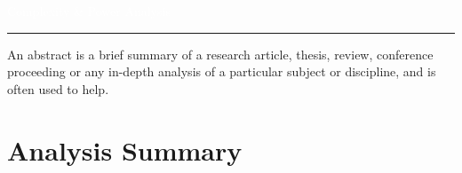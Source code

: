 \documentclass{article}%
\author{%
    MD EIMRAN HOSSAIN EIMON \\
    \texttt{mdeimranhossaineimon@gmail.com}\vspace{40pt} \\

    }
\author{Md Eimran Hossain Eimon\newline%
 mdeimranhossaineimon@gmail.com}%
\makeatletter
\def\printauthor{%
    {\large \@author}}
\makeatother
\begin{document}
%
\normalsize%
\begin{titlepage}
\BgThispage
{}
\noindent
\textcolor{white}{\bigsf Complexity \& Power Analysis}
\vspace*{2.5cm}\par
\noindent
\begin{minipage}{0.35\linewidth}
    \begin{flushright}
        \printauthor
    \end{flushright}
\end{minipage} \hspace{15pt}
%
\begin{minipage}{0.02\linewidth}
    \rule{2pt}{275pt}
\end{minipage} \hspace{-10pt}
%
\begin{minipage}{0.6\linewidth}
\vspace{5pt}

{\huge An abstract is a brief summary of a research article, thesis, review, conference proceeding or any in-depth analysis of a particular subject or discipline, and is often used to help.}

\end{minipage}
\end{titlepage}

\restoregeometry%
\tableofcontents%
\pagestyle{fancy}%
\fancyhf{}%
\fancyhead[L]{\rightmark}%
\fancyhead[R]{\thepage}%
\newpage%
\section{Analysis Summary}%
\label{sec:AnalysisSummary}%
\end{document}
